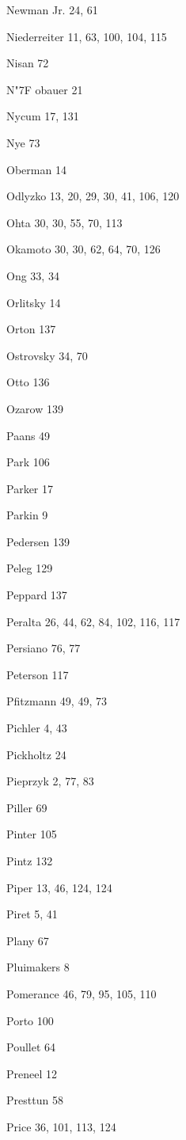 \begin{theindex}
\item {Newman Jr.} 24, 61
\item Niederreiter 11, 63, 100, 104, 115
\item Nisan 72
\item N{\accent "7F o}bauer 21
\item Nycum 17, 131
\item Nye 73
\item Oberman 14
\item Odlyzko 13, 20, 29, 30, 41, 106, 120
\item Ohta 30, 30, 55, 70, 113
\item Okamoto 30, 30, 62, 64, 70, 126
\item Ong 33, 34
\item Orlitsky 14
\item Orton 137
\item Ostrovsky 34, 70
\item Otto 136
\item Ozarow 139
\item Paans 49
\item Park 106
\item Parker 17
\item Parkin 9
\item Pedersen 139
\item Peleg 129
\item Peppard 137
\item Peralta 26, 44, 62, 84, 102, 116, 117
\item Persiano 76, 77
\item Peterson 117
\item Pfitzmann 49, 49, 73
\item Pichler 4, 43
\item Pickholtz 24
\item Pieprzyk 2, 77, 83
\item Piller 69
\item Pinter 105
\item Pintz 132
\item Piper 13, 46, 124, 124
\item Piret 5, 41
\item Plany 67
\item Pluimakers 8
\item Pomerance 46, 79, 95, 105, 110
\item Porto 100
\item Poullet 64
\item Preneel 12
\item Presttun 58
\item Price 36, 101, 113, 124

\end{theindex}
